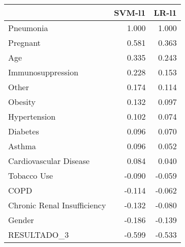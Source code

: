 \begin{tabular}{lrr}
\toprule
{} &  SVM-l1 &  LR-l1 \\
\midrule
Pneumonia                   &   1.000 &  1.000 \\
Pregnant                    &   0.581 &  0.363 \\
Age                         &   0.335 &  0.243 \\
Immunosuppression           &   0.228 &  0.153 \\
Other                       &   0.174 &  0.114 \\
Obesity                     &   0.132 &  0.097 \\
Hypertension                &   0.102 &  0.074 \\
Diabetes                    &   0.096 &  0.070 \\
Asthma                      &   0.096 &  0.052 \\
Cardiovascular Disease      &   0.084 &  0.040 \\
Tobacco Use                 &  -0.090 & -0.059 \\
COPD                        &  -0.114 & -0.062 \\
Chronic Renal Insufficiency &  -0.132 & -0.080 \\
Gender                      &  -0.186 & -0.139 \\
RESULTADO\_3                 &  -0.599 & -0.533 \\
\bottomrule
\end{tabular}
